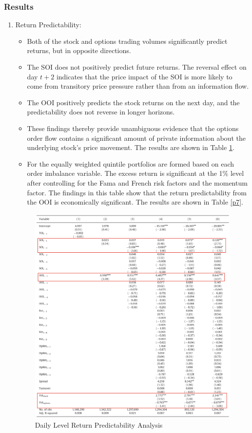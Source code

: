 \documentclass[10pt]{report}
\begin{document}
\subsubsection{Results}
\begin{enumerate}
    \item Return Predictability:
    \begin{itemize}
        \item Both of the stock and options trading volumes significantly predict returns, but in opposite directions.
        \item The SOI does not positively predict future returns. The reversal effect on day $t+2$ indicates that the price impact of the SOI is more likely to come from transitory price pressure rather than from an information flow.
        \item The OOI positively predicts the stock returns on the next day, and the predictability does not reverse in longer horizons.
        \item These findings thereby provide unambiguous evidence that the options order flow contains a significant amount of private information about the
        underlying stock's price movement. The results are shown in Table \ref{p6}.
        \item For the equally weighted quintile portfolios are formed based on each order imbalance variable. The excess return is significant at the 1\% level after controlling for the Fama and French risk factors and the momentum factor. The findings in this table show that the return predictability from the OOI is economically significant. The results are shown in Table \ref{p7}.
    \end{itemize}
    \begin{figure}[!h]
        \centering
        \includegraphics[width=1\linewidth]{p6.png}
        \caption{Daily Level Return Predictability Analysis}
        \label{p6}
    \end{figure}


\end{enumerate}
\end{document}
